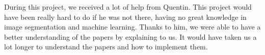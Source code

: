 During this project, we received a lot of help from Quentin. This project would
have been really hard to do if he was not there, having no great knowledge in
image segmentation and machine learning. Thanks to him, we were able to have a
better understanding of the papers by explaining to us. It would have taken us
a lot longer to understand the papers and how to implement them. \\









